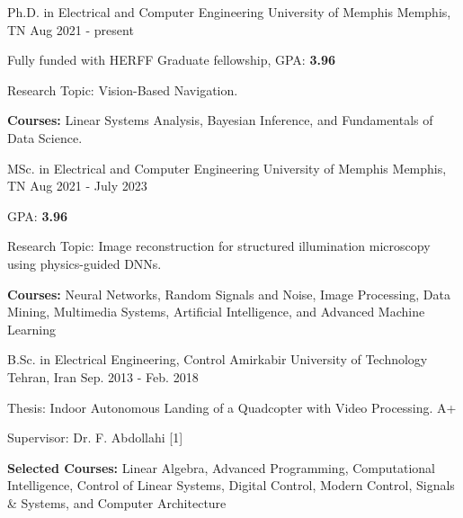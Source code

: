 

\begin{cventries}

\cventry
    {Ph.D. in Electrical and Computer Engineering} %
    {University of Memphis} %
    {Memphis, TN} %
    {Aug 2021 - present} %
    {
      \begin{cvitems} %
        \item {Fully funded with HERFF Graduate fellowship, GPA: \textbf{3.96}}
        \item {Research Topic: Vision-Based Navigation.}
        \item {\textbf{Courses:} Linear Systems Analysis, Bayesian Inference, and Fundamentals of Data Science.}
      \end{cvitems}
    }
    
  \cventry
    {MSc. in Electrical and Computer Engineering} %
    {University of Memphis} %
    {Memphis, TN} %
    {Aug 2021 - July 2023} %
    {
      \begin{cvitems} %
        \item {GPA: \textbf{3.96}}
        \item {Research Topic: Image reconstruction for structured illumination microscopy using physics-guided DNNs.}
        \item {\textbf{Courses:} Neural Networks, Random Signals and Noise, Image Processing, Data Mining, Multimedia Systems, Artificial Intelligence, and Advanced Machine Learning}
      \end{cvitems}
    }
    
  \cventry
    {B.Sc. in Electrical Engineering, Control} %
    {Amirkabir University of Technology} %
    {Tehran, Iran} %
    {Sep. 2013 - Feb. 2018} %
    {
      \begin{cvitems} %
        \item {Thesis: Indoor Autonomous Landing of a Quadcopter with Video Processing. A+} 
        \item {Supervisor: Dr. F. Abdollahi [1]} 
        \item {\textbf{Selected Courses:} Linear Algebra, Advanced Programming, Computational Intelligence, Control of Linear Systems, Digital Control, Modern Control, Signals \& Systems, and Computer Architecture}
      \end{cvitems}
        }
    

\end{cventries}
